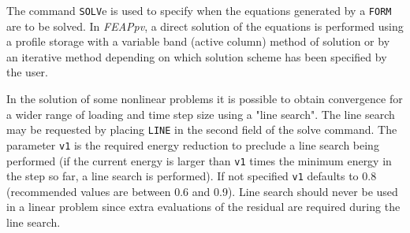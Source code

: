 \headb

The command {\tt SOLV}e is used to specify when the
equations generated by a {\tt FORM} are to be solved.  In {\sl FEAPpv},
a direct solution of the equations is performed using a profile
storage with a variable band (active column) method of
solution or by an iterative method depending on which solution scheme has
been specified by the user.

In the solution of some nonlinear problems it is possible
to obtain convergence for a wider range of loading and
time step size using a "line search".  The line search may
be requested by placing {\tt LINE} in the second field of the
solve command.  The parameter {\tt v1} is the required
energy reduction to preclude a line search being performed
(if the current energy is larger than {\tt v1} times the minimum
energy in the step so far, a line search is performed).  If
not specified {\tt v1} defaults to 0.8 (recommended values are
between 0.6 and 0.9).  Line search should never be used in a
linear problem since extra evaluations of the residual are
required during the line search.
\vfill\eject
